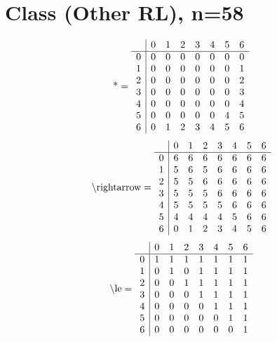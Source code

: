 \documentclass[11pt]{article}
\begin{document}
\section{Class (Other RL), n=58}
\[\text{*} = 
\begin{array}{r | r r r r r r r}
 & 0 & 1 & 2 & 3 & 4 & 5 & 6 \\ \hline
0 & 0 & 0 & 0 & 0 & 0 & 0 & 0 \\
1 & 0 & 0 & 0 & 0 & 0 & 0 & 1 \\
2 & 0 & 0 & 0 & 0 & 0 & 0 & 2 \\
3 & 0 & 0 & 0 & 0 & 0 & 0 & 3 \\
4 & 0 & 0 & 0 & 0 & 0 & 0 & 4 \\
5 & 0 & 0 & 0 & 0 & 0 & 4 & 5 \\
6 & 0 & 1 & 2 & 3 & 4 & 5 & 6 \\
\end{array}
\]
\[\text{\textbackslash rightarrow} = 
\begin{array}{r | r r r r r r r}
 & 0 & 1 & 2 & 3 & 4 & 5 & 6 \\ \hline
0 & 6 & 6 & 6 & 6 & 6 & 6 & 6 \\
1 & 5 & 6 & 5 & 6 & 6 & 6 & 6 \\
2 & 5 & 5 & 6 & 6 & 6 & 6 & 6 \\
3 & 5 & 5 & 5 & 6 & 6 & 6 & 6 \\
4 & 5 & 5 & 5 & 5 & 6 & 6 & 6 \\
5 & 4 & 4 & 4 & 4 & 5 & 6 & 6 \\
6 & 0 & 1 & 2 & 3 & 4 & 5 & 6 \\
\end{array}
\]
\[\text{\textbackslash le} = 
\begin{array}{r | r r r r r r r}
 & 0 & 1 & 2 & 3 & 4 & 5 & 6 \\ \hline
0 & 1 & 1 & 1 & 1 & 1 & 1 & 1 \\
1 & 0 & 1 & 0 & 1 & 1 & 1 & 1 \\
2 & 0 & 0 & 1 & 1 & 1 & 1 & 1 \\
3 & 0 & 0 & 0 & 1 & 1 & 1 & 1 \\
4 & 0 & 0 & 0 & 0 & 1 & 1 & 1 \\
5 & 0 & 0 & 0 & 0 & 0 & 1 & 1 \\
6 & 0 & 0 & 0 & 0 & 0 & 0 & 1 \\
\end{array}
\]
\end{document}
